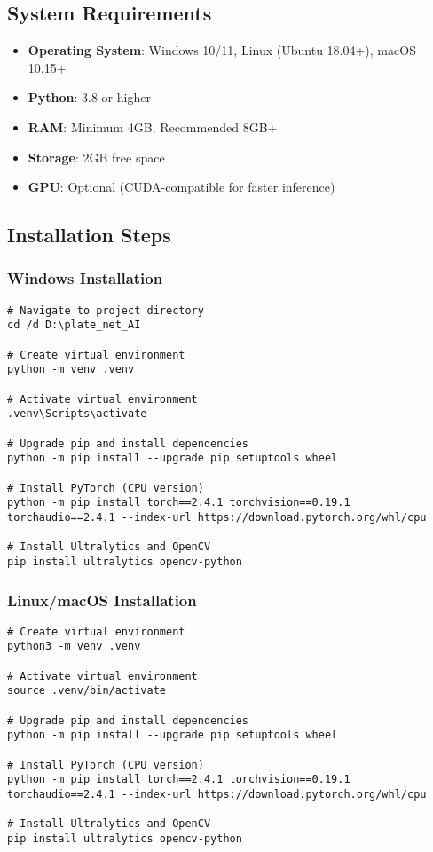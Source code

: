 \documentclass[12pt,a4paper]{article}
\begin{document}
\subsection{System Requirements}
\begin{itemize}
    \item \textbf{Operating System}: Windows 10/11, Linux (Ubuntu 18.04+), macOS 10.15+
    \item \textbf{Python}: 3.8 or higher
    \item \textbf{RAM}: Minimum 4GB, Recommended 8GB+
    \item \textbf{Storage}: 2GB free space
    \item \textbf{GPU}: Optional (CUDA-compatible for faster inference)
\end{itemize}

\subsection{Installation Steps}

\subsubsection{Windows Installation}
\begin{lstlisting}[caption=Windows Setup Commands]
# Navigate to project directory
cd /d D:\plate_net_AI

# Create virtual environment
python -m venv .venv

# Activate virtual environment
.venv\Scripts\activate

# Upgrade pip and install dependencies
python -m pip install --upgrade pip setuptools wheel

# Install PyTorch (CPU version)
python -m pip install torch==2.4.1 torchvision==0.19.1 torchaudio==2.4.1 --index-url https://download.pytorch.org/whl/cpu

# Install Ultralytics and OpenCV
pip install ultralytics opencv-python
\end{lstlisting}

\subsubsection{Linux/macOS Installation}
\begin{lstlisting}[caption=Linux/macOS Setup Commands]
# Create virtual environment
python3 -m venv .venv

# Activate virtual environment
source .venv/bin/activate

# Upgrade pip and install dependencies
python -m pip install --upgrade pip setuptools wheel

# Install PyTorch (CPU version)
python -m pip install torch==2.4.1 torchvision==0.19.1 torchaudio==2.4.1 --index-url https://download.pytorch.org/whl/cpu

# Install Ultralytics and OpenCV
pip install ultralytics opencv-python
\end{lstlisting}
\end{document}
